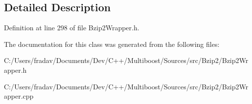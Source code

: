 \subsection{Detailed Description}


Definition at line 298 of file Bzip2\-Wrapper.\-h.



The documentation for this class was generated from the following files\-:\begin{DoxyCompactItemize}
\item 
C\-:/\-Users/fradav/\-Documents/\-Dev/\-C++/\-Multiboost/\-Sources/src/\-Bzip2/Bzip2\-Wrapper.\-h\item 
C\-:/\-Users/fradav/\-Documents/\-Dev/\-C++/\-Multiboost/\-Sources/src/\-Bzip2/Bzip2\-Wrapper.\-cpp\end{DoxyCompactItemize}
